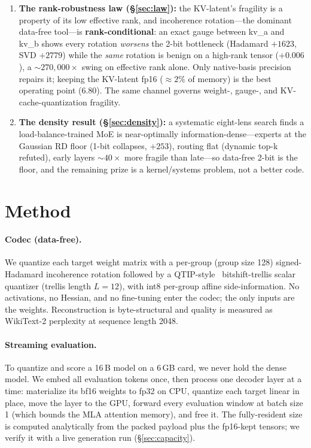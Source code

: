 \documentclass[10pt]{article}
\begin{document}
\begin{enumerate}
MoE batch-1 access pattern, not the silicon---a memory win, not a speed win.
\item \textbf{The rank-robustness law (\S\ref{sec:law}):} the KV-latent's fragility is a property of its
low effective rank, and incoherence rotation---the dominant data-free tool---is \textbf{rank-conditional}:
an exact gauge between kv\_a and kv\_b shows every rotation \emph{worsens} the 2-bit bottleneck (Hadamard
$+1623$, SVD $+2779$) while the \emph{same} rotation is benign on a high-rank tensor ($+0.006$), a
${\sim}270{,}000\times$ swing on effective rank alone. Only native-basis precision repairs it; keeping the
KV-latent fp16 ($\approx2\%$ of memory) is the best operating point (6.80). The same channel governs
weight-, gauge-, and KV-cache-quantization fragility.
\item \textbf{The density result (\S\ref{sec:density}):} a systematic eight-lens search finds a
load-balance-trained MoE is near-optimally information-dense---experts at the Gaussian RD floor (1-bit
collapses, $+253$), routing flat (dynamic top-k refuted), early layers ${\sim}40\times$ more fragile than
late---so data-free 2-bit is the floor, and the remaining prize is a kernel/systems problem, not a better
code.
\end{enumerate}

\section{Method}\label{sec:method}
\paragraph{Codec (data-free).}
We quantize each target weight matrix with a per-group (group size 128) signed-Hadamard incoherence
rotation followed by a QTIP-style~\cite{qtip} bitshift-trellis scalar quantizer (trellis length $L=12$),
with int8 per-group affine side-information. No activations, no Hessian, and no fine-tuning enter the
codec; the only inputs are the weights. Reconstruction is byte-structural and quality is measured as
WikiText-2 perplexity at sequence length 2048.

\paragraph{Streaming evaluation.}
To quantize and score a 16\,B model on a 6\,GB card, we never hold the dense model. We embed all
evaluation tokens once, then process one decoder layer at a time: materialize its bf16 weights to fp32
on CPU, quantize each target linear in place, move the layer to the GPU, forward every evaluation window
at batch size 1 (which bounds the MLA attention memory), and free it. The fully-resident size is
computed analytically from the packed payload plus the fp16-kept tensors; we verify it with a live
generation run (\S\ref{sec:capacity}).
\end{document}
